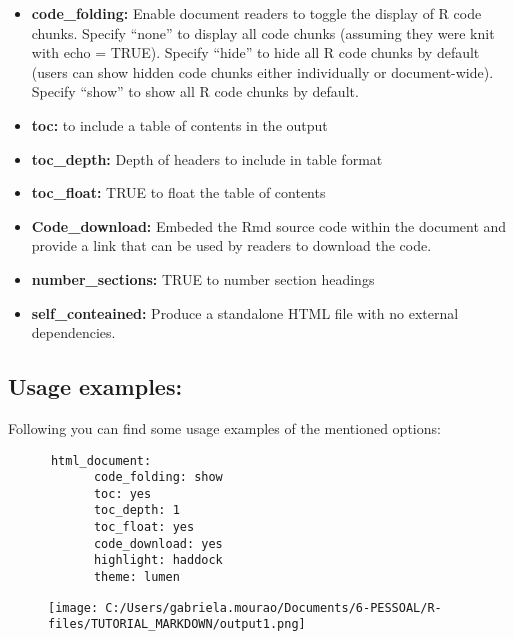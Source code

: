 \documentclass[]{article}
\providecommand{\tightlist}{%
  \setlength{\itemsep}{0pt}\setlength{\parskip}{0pt}}
\begin{document}
\begin{itemize}
\tightlist
\item
  \textbf{code\_folding:} Enable document readers to toggle the display
  of R code chunks. Specify ``none'' to display all code chunks
  (assuming they were knit with echo = TRUE). Specify ``hide'' to hide
  all R code chunks by default (users can show hidden code chunks either
  individually or document-wide). Specify ``show'' to show all R code
  chunks by default.\\
\item
  \textbf{toc:} to include a table of contents in the output\\
\item
  \textbf{toc\_depth:} Depth of headers to include in table format\\
\item
  \textbf{toc\_float:} TRUE to float the table of contents\\
\item
  \textbf{Code\_download:} Embeded the Rmd source code within the
  document and provide a link that can be used by readers to download
  the code.\\
\item
  \textbf{number\_sections:} TRUE to number section headings
\item
  \textbf{self\_conteained:} Produce a standalone HTML file with no
  external dependencies.
\end{itemize}

\subsection{Usage examples:}\label{usage-examples}

Following you can find some usage examples of the mentioned options:

\begin{verbatim}
      html_document:
            code_folding: show
            toc: yes
            toc_depth: 1
            toc_float: yes
            code_download: yes
            highlight: haddock
            theme: lumen
\end{verbatim}

\begin{figure}
\centering
\texttt{[image: C:/Users/gabriela.mourao/Documents/6-PESSOAL/R-files/TUTORIAL\_MARKDOWN/output1.png]}
\caption{}
\end{figure}

\subsection{\texorpdfstring{}{ }}\label{section}
\end{document}
